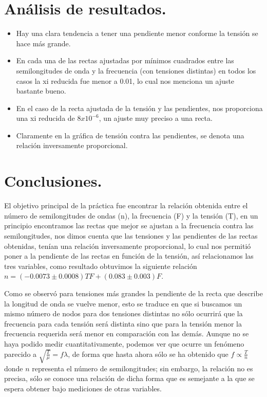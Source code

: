 \documentclass[10pt,a4paper]{article}
\begin{document}
\section{Análisis de resultados.}
\begin{itemize}
    \item Hay una clara tendencia a tener una pendiente menor conforme la tensión se hace más grande.
    \item En cada una de las rectas ajustadas por mínimos cuadrados entre las semilongitudes de onda  y la frecuencia (con tensiones distintas) en todos los casos la xi reducida fue menor a 0.01, lo cual nos menciona un ajuste bastante bueno.
    \item En el caso de la recta ajustada de la tensión y las pendientes, nos proporciona una xi reducida de $8x10^{-6}$, un ajuste muy preciso a una recta.
    \item Claramente en la gráfica de tensión contra las pendientes, se denota una relación inversamente proporcional.
    
\end{itemize}

\section{Conclusiones.}

El objetivo principal de la práctica fue encontrar la relación obtenida entre el número de semilongitudes de ondas (n), la frecuencia (F) y la tensión (T), en un principio encontramos las rectas que mejor se ajustan a la frecuencia contra las semilongitudes, nos dimos cuenta que las tensiones y las pendientes de las rectas obtenidas, tenían una relación inversamente proporcional, lo cual nos permitió poner a la pendiente de las rectas en función de la tensión, así relacionamos las tres variables, como resultado obtuvimos la siguiente relación $n=(-0.0073 \pm 0.0008)TF + (0.083 \pm 0.003)F$.

Como se observó para tensiones más grandes la pendiente de la recta que describe la longitud de onda se vuelve menor, esto se traduce en que si buscamos un mismo número de nodos para dos tensiones distintas no sólo ocurrirá que la frecuencia para cada tensión será distinta sino que para la tensión menor la frecuencia requerida será menor en comparación con las demás. Aunque no se haya podido medir cuantitativamente, podemos ver que ocurre un fenómeno parecido a $ \sqrt{\frac{T}{\mu}} = f \lambda$, de forma que hasta ahora sólo se ha obtenido que $f \propto \frac{T}{n}$ donde $n$ representa el número de semilongitudes; sin embargo, la relación no es precisa, sólo se conoce una relación de dicha forma que es semejante a la que se espera obtener bajo mediciones de otras variables.
\end{document}
